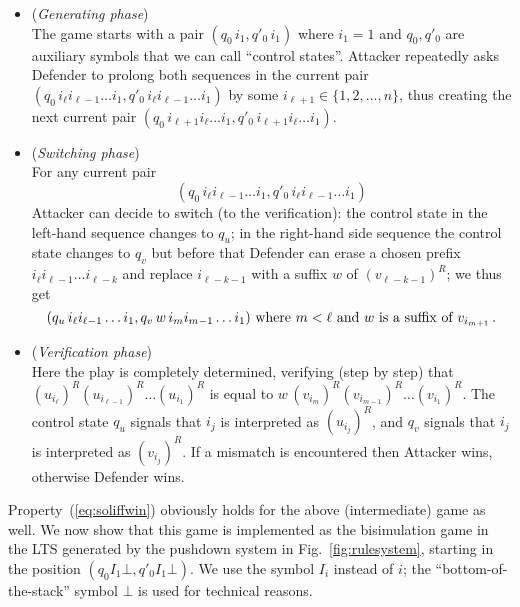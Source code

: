 \documentclass[11pt]{article}
\begin{document}
\begin{itemize}
\item
(\emph{Generating phase}) 
\\
The game starts with a pair $(q_0\, i_1, q'_0\, i_1)$ where $i_1=1$
and $q_0, q'_0$ are auxiliary symbols that we can call ``control
states''.
Attacker repeatedly asks Defender to prolong 
both sequences in the current pair 
$(q_0\, {i_\ell}{i_{\ell-1}}\dots {i_{1}},q'_0\, {i_\ell} {i_{\ell-1}}\dots {i_{1}})$ 
by some $i_{\ell+1}\in\{1,2,\dots,n\}$,
thus creating the next current pair 
$(q_0\, {i_{\ell+1}} {i_{\ell}}\dots {i_{1}},q'_0\, {i_{\ell+1}}
{i_{\ell}}\dots {i_{1}})$. 
\item
(\emph{Switching phase}) 
\\
For any current pair 
\begin{equation}\label{eq:switchstart}
(q_0\, {i_\ell} {i_{\ell-1}}\dots {i_{1}},q'_0\, {i_\ell} {i_{\ell-1}}\dots {i_{1}})
\end{equation}
Attacker can decide to switch (to the verification): 
the control state in the left-hand sequence changes to $q_u$;
in the right-hand side sequence 
the control state changes to $q_v$ but before that
Defender can erase a chosen prefix 
${i_{\ell}}{i_{\ell-1}}\dots {i_{\ell-k}}$ and replace 
${i_{\ell-k-1}}$ with a suffix $w$ of $(v_{\ell-k-1})^R$; we thus get
\begin{equation}\label{eq:switchend}
(q_u\, {i_\ell} {i_{\ell-1}}\dots {i_{1}},q_v\, w\,{i_m} {i_{m-1}}\dots {i_{1}})
\textnormal{ where } m<\ell \textnormal{ and } 
w \textnormal{ is a suffix of } v_{i_{m+1}}\,. 
\end{equation}
\item
(\emph{Verification phase})
\\
Here the play is completely determined, verifying (step by step)
that 
 $(u_{i_\ell})^R (u_{i_{\ell-1}})^R\dots (u_{i_{1}})^R$ is equal
to
 $w\, (v_{i_m})^R (v_{i_{m-1}})^R\dots (v_{i_{1}})^R$.
The control state $q_u$ signals that $i_j$ is interpreted as 
$(u_{i_j})^R$, and $q_v$ signals that $i_j$ is interpreted as 
$(v_{i_j})^R$.
If a mismatch is encountered then Attacker wins, otherwise Defender wins.
\end{itemize}
Property~(\ref{eq:soliffwin}) obviously holds  
for the above (intermediate) game as well.
We now show that 
this game is implemented as the bisimulation game 
in the LTS generated by the pushdown system 
in Fig.~\ref{fig:rulesystem}, 
starting in the position $(q_0 I_1\bot, q'_0 I_1\bot)$.
We use the symbol $I_i$ instead of $i$; 
the ``bottom-of-the-stack'' symbol
$\bot$ is used for technical reasons.
\end{document}
